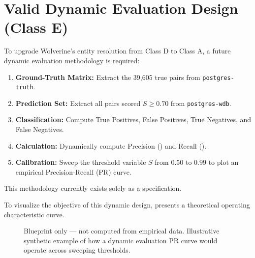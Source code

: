 \section{Valid Dynamic Evaluation Design (Class E)}
\label{sec:eval-design}
To upgrade Wolverine's entity resolution from Class D to Class A, a future dynamic evaluation methodology is required:
\begin{enumerate}
    \item \textbf{Ground-Truth Matrix:} Extract the 39,605 true pairs from \texttt{postgres-truth}.
    \item \textbf{Prediction Set:} Extract all pairs scored $S \ge 0.70$ from \texttt{postgres-wdb}.
    \item \textbf{Classification:} Compute True Positives, False Positives, True Negatives, and False Negatives.
    \item \textbf{Calculation:} Dynamically compute Precision () and Recall ().
    \item \textbf{Calibration:} Sweep the threshold variable $S$ from $0.50$ to $0.99$ to plot an empirical Precision-Recall (PR) curve.
\end{enumerate}
This methodology currently exists solely as a specification.

To visualize the objective of this dynamic design,  presents a theoretical operating characteristic curve.

\begin{figure}[htbp]
\centering
{}
\caption{Blueprint only — not computed from empirical data. Illustrative synthetic example of how a dynamic evaluation PR curve would operate across sweeping thresholds.}
\label{fig:pr-blueprint}
\end{figure}

